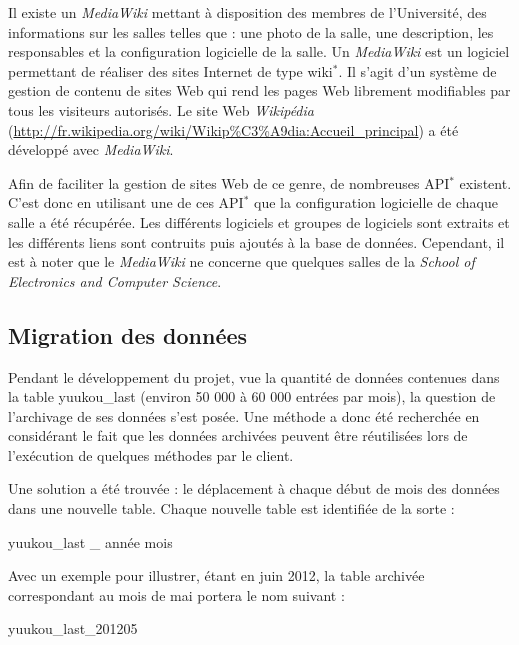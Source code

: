 Il existe un \textit{MediaWiki} mettant \`a disposition des membres de l'Universit\'e, des informations sur les salles telles que : une photo de la salle, une description, les responsables et la configuration logicielle de la salle.
Un \textit{MediaWiki} est un logiciel permettant de r\'ealiser des sites Internet de type wiki$^*$. 
Il s'agit d'un syst\`eme de gestion de contenu de sites Web qui rend les pages Web librement modifiables par tous les visiteurs autoris\'es.
Le site Web \textit{Wikip\'edia} (\url{http://fr.wikipedia.org/wiki/Wikip\%C3\%A9dia:Accueil\_principal}) a \'et\'e d\'evelopp\'e avec \textit{MediaWiki}.

Afin de faciliter la gestion de sites Web de ce genre, de nombreuses API$^*$ existent.
C'est donc en utilisant une de ces API$^*$ que la configuration logicielle de chaque salle a \'et\'e r\'ecup\'er\'ee.
Les diff\'erents logiciels et groupes de logiciels sont extraits et les diff\'erents liens sont contruits puis ajout\'es \`a la base de donn\'ees.
Cependant, il est \`a noter que le \textit{MediaWiki} ne concerne que quelques salles de la \textit{School of Electronics and Computer Science}.

\subsection{Migration des donn\'ees}
\label{section:migrationDonnees}

Pendant le d\'eveloppement du projet, vue la quantit\'e de donn\'ees contenues dans la table \textsf{yuukou\_last} (environ 50 000 \`a 60 000 entr\'ees par mois), la question de l'archivage de ses donn\'ees s'est pos\'ee.
Une m\'ethode a donc \'et\'e recherch\'ee en consid\'erant le fait que les donn\'ees archiv\'ees peuvent \^etre r\'eutilis\'ees lors de l'ex\'ecution de quelques m\'ethodes par le client.

Une solution a \'et\'e trouv\'ee : le d\'eplacement \`a chaque d\'ebut de mois des donn\'ees dans une nouvelle table.
Chaque nouvelle table est identifi\'ee de la sorte : 

\begin{center}
	\textsf{yuukou\_last \_ ann\'ee mois}

\end{center}

Avec un exemple pour illustrer, \'etant en juin 2012, la table archiv\'ee correspondant au mois de mai portera le nom suivant : 

\begin{center}
	\textsf{yuukou\_last\_201205}

\end{center}

